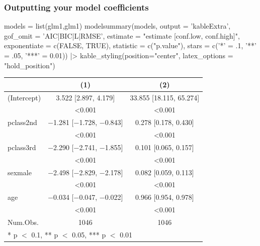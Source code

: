 \documentclass[a4paper]{article}\usepackage[]{graphicx}\usepackage[]{xcolor}
\begin{document}
\subsubsection{Outputting your model coefficients}
\begin{Schunk}
\begin{Sinput}
models = list(glm1,glm1)
modelsummary(models, output = 'kableExtra', gof_omit = 'AIC|BIC|L|RMSE', estimate = "{estimate} [{conf.low}, {conf.high}]", exponentiate = c(FALSE, TRUE), statistic = c("{p.value}"), stars = c('*' = .1, '**' = .05, '***' = 0.01)) |>
  kable_styling(position="center", latex_options = "hold_position")
\end{Sinput}
\begin{table}[!h]
\centering
\begin{tabular}[t]{lcc}
\toprule
  & (1) & (2)\\
\midrule
(Intercept) & \num{3.522} [\num{2.897}, \num{4.179}] & \num{33.855} [\num{18.115}, \num{65.274}]\\
 & \num{<0.001} & \vphantom{4} \num{<0.001}\\
pclass2nd & \num{-1.281} [\num{-1.728}, \num{-0.843}] & \num{0.278} [\num{0.178}, \num{0.430}]\\
 & \num{<0.001} & \vphantom{3} \num{<0.001}\\
pclass3rd & \num{-2.290} [\num{-2.741}, \num{-1.855}] & \num{0.101} [\num{0.065}, \num{0.157}]\\
 & \num{<0.001} & \vphantom{2} \num{<0.001}\\
sexmale & \num{-2.498} [\num{-2.829}, \num{-2.178}] & \num{0.082} [\num{0.059}, \num{0.113}]\\
 & \num{<0.001} & \vphantom{1} \num{<0.001}\\
age & \num{-0.034} [\num{-0.047}, \num{-0.022}] & \num{0.966} [\num{0.954}, \num{0.978}]\\
 & \num{<0.001} & \num{<0.001}\\
\midrule
Num.Obs. & \num{1046} & \num{1046}\\
\bottomrule
\multicolumn{3}{l}{\rule{0pt}{1em}* p $<$ 0.1, ** p $<$ 0.05, *** p $<$ 0.01}\\
\end{tabular}
\end{table}

\end{Schunk}
\end{document}
